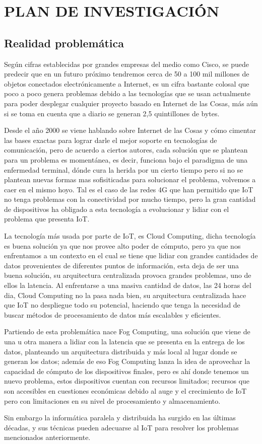 \newpage

\section{PLAN DE INVESTIGACIÓN}
    \subsection{Realidad problemática}
    Según cifras establecidas por grandes empresas del medio como Cisco,  se puede predecir que en un futuro próximo tendremos cerca de 50 a 100 mil millones de objetos conectados electrónicamente a Internet, es un cifra bastante colosal que poco a poco genera problemas debido a las tecnologías que se usan actualmente para poder desplegar cualquier proyecto basado en Internet de las Cosas, más aún si se toma en cuenta que a diario se generan 2,5 quintillones de bytes.\par
    Desde el año 2000 se viene hablando sobre Internet de las Cosas y cómo cimentar las bases exactas para lograr darle el mejor soporte en tecnologías de comunicación, pero de acuerdo a ciertos autores, cada solución que se plantean para un problema es momentánea, es decir, funciona bajo el paradigma de una enfermedad terminal, dónde cura la herida por un cierto tiempo pero si no se plantean nuevas formas mas sofisiticadas para solucionar el problema, volvemos a caer en el mismo hoyo. Tal es el caso de las redes 4G que han permitido que IoT no tenga problemas con la conectividad por mucho tiempo, pero la gran cantidad de dispositivos ha obligado a esta tecnología a evolucionar y lidiar con el problema que presenta IoT.\par
    La tecnología más usada por parte de IoT, es Cloud Computing, dicha tecnología es buena solución ya que nos provee alto poder de cómputo, pero ya que nos enfrentamos a un contexto en el cual se tiene que lidiar con grandes cantidades de datos provenientes de diferentes puntos de información, esta deja de ser una buena solución,  su arquitectura centralizada provoca grandes problemas, uno de ellos la latencia. Al enfrentarse a una masiva cantidad de datos, las 24 horas del dia, Cloud Computing no la pasa nada bien, su arquitectura centralizada hace que IoT no despliegue todo su potencial, haciendo que tenga la necesidad  de buscar métodos de procesamiento de datos más escalables y eficientes. \par
    Partiendo de esta problemática nace Fog Computing, una solución que viene de una u otra manera  a lidiar con la latencia que se presenta en la entrega de los datos, planteando un arquitectura distribuida y más local al lugar donde se generan los datos; además de eso Fog Computing lanza la idea de aprovechar la capacidad de cómputo de los dispositivos finales, pero es ahí donde tenemos un nuevo problema, estos dispositivos cuentan con recursos limitados; recursos que son accesibles en cuestiones económicas debido al auge y el crecimiento de IoT pero con limitaciones en su nivel de procesamiento y almacenamiento.\par
    Sin embargo la informática paralela y distribuida ha surgido en las últimas décadas, y sus técnicas pueden adecuarse al IoT para resolver los problemas mencionados anteriormente.\par
